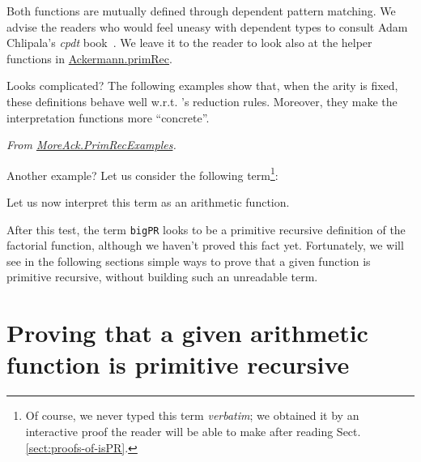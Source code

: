 
Both functions are mutually defined through dependent pattern matching. We advise the readers who 
would feel uneasy with dependent types to consult Adam Chlipala's \emph{cpdt}  book~\cite{chlipalacpdt2011}. We leave it to the reader  to look also at the helper functions in
\href{../theories/html/hydras.Ackermann.primRec.html}{Ackermann.primRec}.

\vspace{4pt}



\vspace{4pt}

Looks complicated? The following examples show that, when
the arity is fixed, these definitions behave well w.r.t. 
\coq's reduction rules. Moreover, they make the interpretation functions more ``concrete''.

\vspace{4pt}
\noindent
\emph{From \href{../theories/html/hydras.MoreAck.PrimRecExamples.html}{MoreAck.PrimRecExamples}.}



\vspace{4pt}
\noindent

Another example?
Let us consider the following term\footnote{Of course, we never typed this term \emph{verbatim}; we obtained it by an interactive proof the reader will be able to make after 
reading Sect.\vref{sect:proofs-of-isPR}.}:

\label{sect:bigfac}




Let us now interpret this term as an arithmetic function.

\vspace{4pt}
\noindent




After this test, the term \texttt{bigPR} looks to be a primitive recursive definition of the factorial function, although we haven't proved this fact yet. Fortunately, we will see in the following sections simple ways to prove that a given function is primitive recursive, without building such an unreadable term.

\section{Proving that a given arithmetic function is primitive recursive}
\label{sect:proofs-of-isPR}

